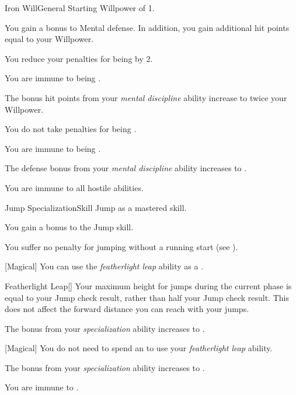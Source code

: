     \begin{feat}{Iron Will}{General}
        \featpre Starting Willpower of 1.

         You gain a  bonus to Mental defense.
        In addition, you gain additional hit points equal to your Willpower.

         You reduce your penalties for being  by 2.

         You are immune to being .

         The bonus hit points from your \textit{mental discipline} ability increase to twice your Willpower.

         You do not take penalties for being .

         You are immune to being .

         The defense bonus from your \textit{mental discipline} ability increases to .

         You are immune to all hostile  abilities.
    \end{feat}

    \begin{feat}{Jump Specialization}{Skill}
        \featpre Jump as a mastered skill.

         You gain a  bonus to the Jump skill.

         You suffer no penalty for jumping without a running start (see ).

        [Magical] You can use the \textit{featherlight leap} ability as a .
        \begin{apability}{Featherlight Leap}[]
            Your maximum height for jumps during the current phase is equal to your Jump check result, rather than half your Jump check result.
            This does not affect the forward distance you can reach with your jumps.
        \end{apability}

         The bonus from your \textit{specialization} ability increases to .

        [Magical] You do not need to spend an  to use your \textit{featherlight leap} ability.

         The bonus from your \textit{specialization} ability increases to .

         You are immune to .
    \end{feat}

